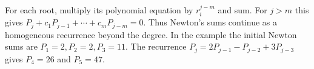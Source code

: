 For each root, multiply its polynomial equation by $r_i^{j-m}$ and sum. For $j>m$ this gives $\boxed{P_j+c_1P_{j-1}+\cdots+c_mP_{j-m}=0}$. Thus Newton's sums continue as a homogeneous recurrence beyond the degree. In the example the initial Newton sums are $P_1=2,P_2=2,P_3=11$. The recurrence $P_j=2P_{j-1}-P_{j-2}+3P_{j-3}$ gives $P_4=26$ and $\boxed{P_5=47}$.
